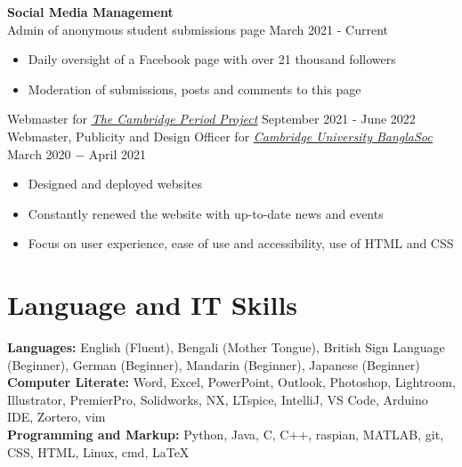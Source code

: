 \documentclass{article}
\begin{document}
\textbf{Social Media Management}\\
Admin of anonymous student submissions page \hfill March 2021 - Current
\begin{itemize}
    \item Daily oversight of a Facebook page with over 21 thousand followers
    \item Moderation of submissions, posts and comments to this page
\end{itemize}
Webmaster for \href{http://tcpp.soc.srcf.net/}{\underline{\textit{The Cambridge Period Project}}} \hfill September 2021 - June 2022\\ 
Webmaster, Publicity and Design Officer for \href{https://cambridgebanglasoc.org/}{\underline{\textit{Cambridge University BanglaSoc}}} \hfill March 2020 $-$ April 2021
\begin{itemize}
    \item Designed and deployed websites
    \item Constantly renewed the website with up-to-date news and events 
    \item Focus on user experience, ease of use and accessibility, use of HTML and CSS
\end{itemize} \medskip

\vspace{-.5\baselineskip}
\hrulefill
\vspace{-.5\baselineskip}

\section*{Language and IT Skills}
\textbf{Languages:} English (Fluent), Bengali (Mother Tongue), British Sign Language (Beginner), German (Beginner), Mandarin (Beginner), Japanese (Beginner) \\
\textbf{Computer Literate:} Word, Excel, PowerPoint, Outlook, Photoshop, Lightroom, Illustrator, PremierPro, Solidworks, NX, LTspice, IntelliJ, VS Code, Arduino IDE, Zortero, vim\\
\textbf{Programming and Markup:} Python, Java, C, C++, raspian, MATLAB, git, CSS, HTML, Linux, cmd, \LaTeX \medskip

\vspace{-.5\baselineskip}
\hrulefill
\vspace{-.5\baselineskip}
\end{document}
